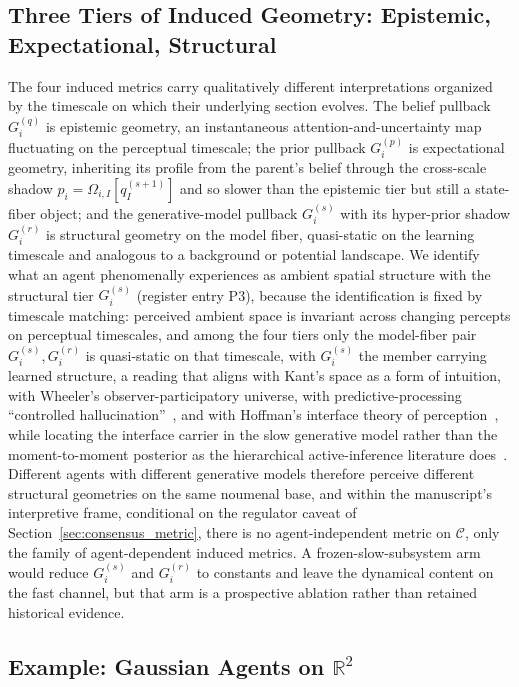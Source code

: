 \documentclass[11pt]{article}
\begin{document}
\subsection{Three Tiers of Induced Geometry: Epistemic, Expectational, Structural}
\label{sec:three_tiers}

The four induced metrics carry qualitatively different interpretations organized by the timescale on which their underlying section evolves. The belief pullback $G_i^{(q)}$ is epistemic geometry, an instantaneous attention-and-uncertainty map fluctuating on the perceptual timescale; the prior pullback $G_i^{(p)}$ is expectational geometry, inheriting its profile from the parent's belief through the cross-scale shadow $p_i = \Omega_{i,I}[q_I^{(s+1)}]$ and so slower than the epistemic tier but still a state-fiber object; and the generative-model pullback $G_i^{(s)}$ with its hyper-prior shadow $G_i^{(r)}$ is structural geometry on the model fiber, quasi-static on the learning timescale and analogous to a background or potential landscape. We identify what an agent phenomenally experiences as ambient spatial structure with the structural tier $G_i^{(s)}$ (register entry P3), because the identification is fixed by timescale matching: perceived ambient space is invariant across changing percepts on perceptual timescales, and among the four tiers only the model-fiber pair $G_i^{(s)}, G_i^{(r)}$ is quasi-static on that timescale, with $G_i^{(s)}$ the member carrying learned structure, a reading that aligns with Kant's space as a form of intuition, with Wheeler's observer-participatory universe, with predictive-processing ``controlled hallucination''~\cite{Clark2016, Seth2021}, and with Hoffman's interface theory of perception~\cite{Hoffman2019}, while locating the interface carrier in the slow generative model rather than the moment-to-moment posterior as the hierarchical active-inference literature does~\cite{Friston2017}. Different agents with different generative models therefore perceive different structural geometries on the same noumenal base, and within the manuscript's interpretive frame, conditional on the regulator caveat of Section~\ref{sec:consensus_metric}, there is no agent-independent metric on $\mathcal{C}$, only the family of agent-dependent induced metrics. A frozen-slow-subsystem arm would reduce $G_i^{(s)}$ and $G_i^{(r)}$ to constants and leave the dynamical content on the fast channel, but that arm is a prospective ablation rather than retained historical evidence.

\subsection{Example: Gaussian Agents on $\mathbb{R}^2$}
\end{document}
